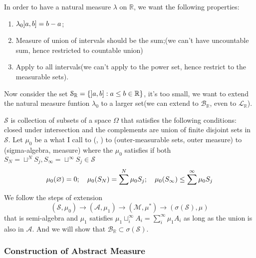In order to have a natural measure \(\lambda\) on \(\mathbb{R}\), we want the following properties:
\begin{enumerate}
    \item \(\lambda_{0} \linterval{a}{b} = b - a \);
    \item Measure of union of intervals should be the sum;(we can't have uncountable sum, hence restricted to countable union)
    \item Apply to all intervals(we can't apply to the power set, hence restrict to the measurable sets).
\end{enumerate}

Now consider the set \(\mathcal{S}_{\mathbb{R}} = \Bqty{\linterval{a}{b} : a\leq b \in \mathbb{R}}\), it's too small, we want to extend the natural measure funtion \(\lambda_{0}\) to a larger set(we can extend to \(\mathcal{B}_{\mathbb{R}}\), even to \(\mathcal{L}_{\mathbb{R}}\)). 


 \(\mathcal{S}\) is collection of subsets of a space \(\Omega\) that satisfies the following conditions: closed under intersection and the complements are union of finite disjoint sets in \(\mathcal{S}\). Let \(\mu_{0}\) be a what I call  to ({, }) to (outer-measurable sets, outer measure) to ({sigma-algebra, measure}) where the  \(\mu_{0}\) satisfies if both \(S_{N} = \sqcup^{N}S_{j}, S_{\infty} = \sqcup^{\infty}S_{j} \in \mathcal{S}\)
\begin{equation*}
    \mu_{0}(\emptyset) = 0 ; \quad \mu_{0}\pqty{S_{N}} = \sum^{N} \mu_{0}S_{j}; \quad  \mu_{0}\pqty{S_{\infty}} \leq \sum^{\infty} \mu_{0}S_{j}
\end{equation*} 

We follow the steps of extension
\begin{equation*}
    (\mathcal{S}, \mu_{0}) \to (\mathcal{A}, \mu_{1}) \to (\mathcal{M}, \mu^{*}) \to (\sigma(\mathcal{S}), \mu)
\end{equation*}
that is semi-algebra and 
 \(\mu_{1}\) satisfies \(\mu_{1}\sqcup_{i}^{\infty} A_{i} = \sum_{i}^{\infty} \mu_{1} A_{i}\) as long as the union is also in \(\mathcal{A}\). And we will show that \(\mathcal{B}_{\mathbb{R}} \subset \sigma(\mathcal{S})\). 

\subsubsection{Construction of Abstract Measure}

